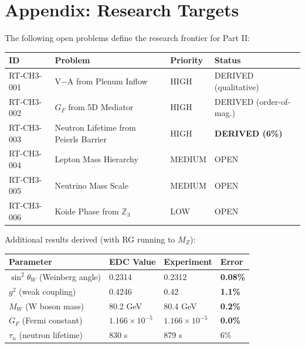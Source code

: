\documentclass[11pt,a4paper]{book}
\theoremstyle{definition}
\theoremstyle{remark}
\begin{document}
\backmatter

\chapter*{Appendix: Research Targets}

The following open problems define the research frontier for Part II:

\begin{center}
\small
\begin{tabular}{@{}lp{4.5cm}lp{3.8cm}@{}}
\toprule
\textbf{ID} & \textbf{Problem} & \textbf{Priority} & \textbf{Status} \\
\midrule
RT-CH3-001 & V$-$A from Plenum Inflow & HIGH & DERIVED (qualitative) \\
RT-CH3-002 & $G_F$ from 5D Mediator & HIGH & DERIVED (order-of-mag.) \\
RT-CH3-003 & Neutron Lifetime from Peierls Barrier & HIGH & \textbf{DERIVED (6\%)} \\
RT-CH3-004 & Lepton Mass Hierarchy & MEDIUM & OPEN \\
RT-CH3-005 & Neutrino Mass Scale & MEDIUM & OPEN \\
RT-CH3-006 & Koide Phase from $\mathbb{Z}_3$ & LOW & OPEN \\
\bottomrule
\end{tabular}
\end{center}

Additional results derived (with RG running to $M_Z$):
\begin{center}
\begin{tabular}{llll}
\toprule
\textbf{Parameter} & \textbf{EDC Value} & \textbf{Experiment} & \textbf{Error} \\
\midrule
$\sin^2\theta_W$ (Weinberg angle) & 0.2314 & 0.2312 & \textbf{0.08\%} \\
$g^2$ (weak coupling) & 0.4246 & 0.42 & \textbf{1.1\%} \\
$M_W$ (W boson mass) & 80.2 GeV & 80.4 GeV & \textbf{0.2\%} \\
$G_F$ (Fermi constant) & $1.166 \times 10^{-5}$ & $1.166 \times 10^{-5}$ & \textbf{0.0\%} \\
$\tau_n$ (neutron lifetime) & 830 s & 879 s & 6\% \\
\bottomrule
\end{tabular}
\end{center}
\end{document}
